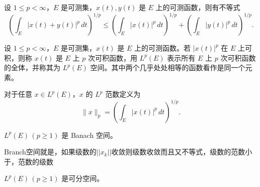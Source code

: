 \begin{lemma}\label{lem:minkowski}
设 $1\le p<\infty$，$E$ 是可测集，$x(t),y(t)$ 是 $E$ 上的可测函数，则有不等式
\[
\left(\int_E |x(t)+y(t)|^p\,dt\right)^{\!1/p}
\le
\left(\int_E |x(t)|^p\,dt\right)^{\!1/p}
+\left(\int_E |y(t)|^p\,dt\right)^{\!1/p}.
\]
\end{lemma}
\begin{definition}[空间 $L^p(E)$-p次可积空间]
设 $1 \le p < \infty$，$E$ 是可测集，$x(t)$ 是 $E$ 上的可测函数。若 $|x(t)|^p$ 在 $E$ 上可积，则称 $x(t)$ 是 $E$ 上 $p$ 次可积函数，用 $L^p(E)$ 表示所有 $E$ 上 $p$ 次可积函数的全体，并称其为 $L^p(E)$ 空间。其中两个几乎处处相等的函数看作是同一个元素。

对于任意 $x \in L^p(E)$，$x$ 的 $L^p$ 范数定义为
\[
\|x\|_p = \left( \int_E |x(t)|^p \, dt \right)^{1/p}.
\]
\end{definition}
\begin{theorem}\label{thm:banach}
$L^p(E)\,(p\ge1)$ 是 Banach 空间。
\end{theorem}
Branch空间就是，如果级数的$||x_k||$收敛则级数收敛而且又不等式，级数的范数小于，范数的级数
\begin{theorem}\label{thm:separable}
$L^p(E)\,(p\ge1)$ 是可分空间。
\end{theorem}

